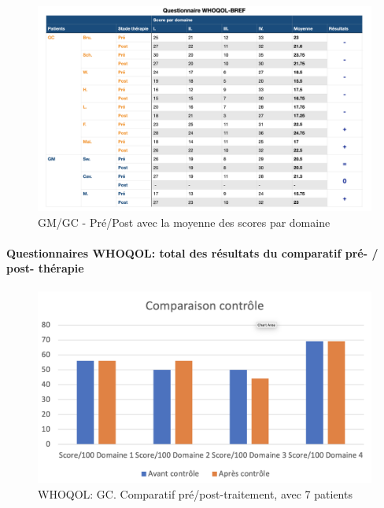  
 \begin{figure}
 	\centering
 	\includegraphics[width=\linewidth]{images/graphiques/questionnaire_wq.png}
 	\caption[Questionnaire WHOQOL-BREF]{GM/GC - Pré/Post avec la moyenne des scores par 
 		domaine}
 	
 \end{figure}
 
 
 
 
 
 \paragraph{Questionnaires WHOQOL: total des résultats du 
 	comparatif pré- / post- thé\-ra\-pie}
 
 
 
 \begin{figure} [th]
 	\centering
 	\includegraphics[width=\linewidth]{images/Compcontrole.png}
 	\caption[Schéma du déroulement]{WHOQOL:  GC. Comparatif pré/post-traitement, avec 7 patients}
 	
 \end{figure}
 
